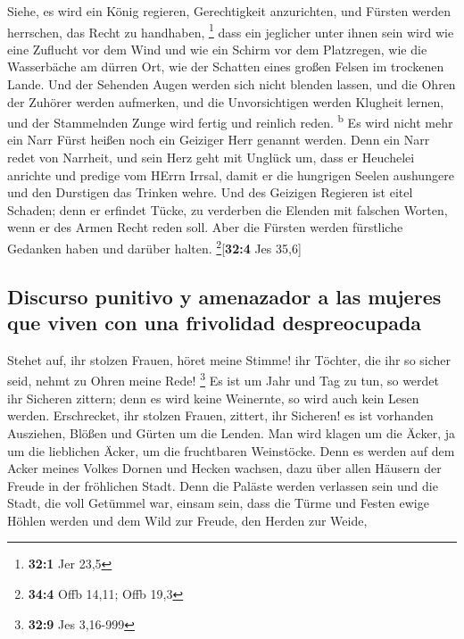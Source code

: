  Siehe, es wird ein König regieren, Gerechtigkeit
anzurichten, und Fürsten werden herrschen, das Recht zu handhaben,
\footnote{\textbf{32:1} Jer 23,5}  dass ein jeglicher
unter ihnen sein wird wie eine Zuflucht vor dem Wind und wie ein Schirm
vor dem Platzregen, wie die Wasserbäche am dürren Ort, wie der Schatten
eines großen Felsen im trockenen Lande.  Und der Sehenden
Augen werden sich nicht blenden lassen, und die Ohren der Zuhörer werden
aufmerken,  und die Unvorsichtigen werden Klugheit lernen,
und der Stammelnden Zunge wird fertig und reinlich reden.
\textsuperscript{b}  Es wird nicht mehr ein Narr Fürst
heißen noch ein Geiziger Herr genannt werden.  Denn ein
Narr redet von Narrheit, und sein Herz geht mit Unglück um, dass er
Heuchelei anrichte und predige vom HErrn Irrsal, damit er die hungrigen
Seelen aushungere und den Durstigen das Trinken wehre. 
Und des Geizigen Regieren ist eitel Schaden; denn er erfindet Tücke, zu
verderben die Elenden mit falschen Worten, wenn er des Armen Recht reden
soll.  Aber die Fürsten werden fürstliche Gedanken haben
und darüber halten. \footnote{\textbf{34:4} Offb 14,11; Offb 19,3}{[}\textbf{32:4}
Jes 35,6{]}

\hypertarget{discurso-punitivo-y-amenazador-a-las-mujeres-que-viven-con-una-frivolidad-despreocupada}{%
\subsection{Discurso punitivo y amenazador a las mujeres que viven con
una frivolidad
despreocupada}\label{discurso-punitivo-y-amenazador-a-las-mujeres-que-viven-con-una-frivolidad-despreocupada}}

 Stehet auf, ihr stolzen Frauen, höret meine Stimme! ihr
Töchter, die ihr so sicher seid, nehmt zu Ohren meine Rede! \footnote{\textbf{32:9}
  Jes 3,16-999}  Es ist um Jahr und Tag zu tun, so werdet
ihr Sicheren zittern; denn es wird keine Weinernte, so wird auch kein
Lesen werden.  Erschrecket, ihr stolzen Frauen, zittert,
ihr Sicheren! es ist vorhanden Ausziehen, Blößen und Gürten um die
Lenden.  Man wird klagen um die Äcker, ja um die
lieblichen Äcker, um die fruchtbaren Weinstöcke.  Denn es
werden auf dem Acker meines Volkes Dornen und Hecken wachsen, dazu über
allen Häusern der Freude in der fröhlichen Stadt.  Denn
die Paläste werden verlassen sein und die Stadt, die voll Getümmel war,
einsam sein, dass die Türme und Festen ewige Höhlen werden und dem Wild
zur Freude, den Herden zur Weide,

